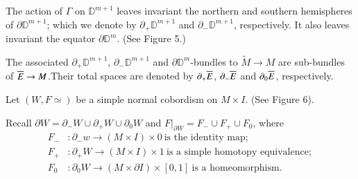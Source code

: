 The action of $\Gamma$ on $\mathbb{D}^{m+1}$ leaves invariant the
northern and southern hemispheres of $\partial \mathbb{D}^{m+1}$;
which we denote by $\partial_+ \mathbb{D}^{m+1}$ and $\partial_-
\mathbb{D}^{m+1}$, respectively. It also leaves invariant the equator
$\partial \mathbb{D}^m$. (See Figure 5.) 
\begin{figure}[H]
\end{figure}

The associated $\partial_+ \mathbb{D}^{m+1}$, $\partial_-
\mathbb{D}^{m+1}$ and $\partial \mathbb{D}^m$-bundles to $\tilde{M}
\to M$ are sub-bundles of $\overline{E} \to M$.\pageoriginale Their total spaces are
denoted by $\partial _+ \overline{E}$, $\partial_- \overline{E}$ and $\partial _0
\overline{E}$, respectively. 

Let $(W, F \simeq)$ be a simple normal cobordism on $M \times I$. (See
Figure 6).
\begin{figure}[H]
\end{figure}

Recall $\partial W = \partial_- W \cup \partial _+ W \cup \partial_0
W$ and $F|_{\partial W} = F_- \cup F_+ \cup F_0$, where
\begin{align*}
  F_- & : \partial _- w \to (M \times I) \times 0 ~\text{is the
    identity map};\\
  F_+ & : \partial_+ W \to (M \times I) \times 1 ~\text{is a simple
    homotopy equivalence};\\
  F_0 & : \partial_0 W \to (M \times \partial I) \times [0, 1]
  ~\text{is a homeomorphism}.
\end{align*}

